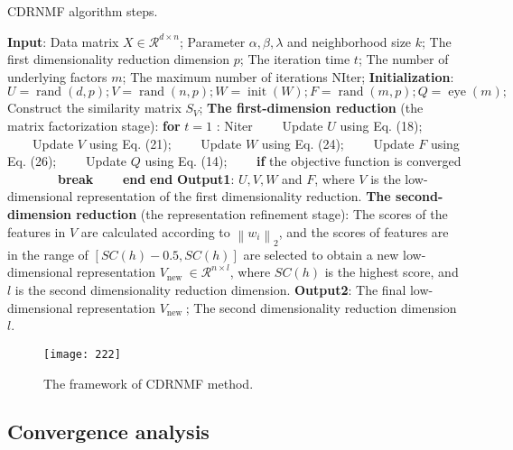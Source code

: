 \documentclass[a4paper,fleqn]{cas-sc}
\begin{document}
\begin{algorithm}[h]
	\caption{CDRNMF algorithm steps.}
	{\footnotesize
	\begin{algorithmic}[1]
		\State \textbf{Input}: Data matrix $X \in \mathcal{R}^{d \times n}$; Parameter $\alpha, \beta, \lambda$ and neighborhood size $k$; The first dimensionality reduction dimension $p$; The iteration time $t$; The number of underlying factors $m$; The maximum number of iterations NIter;
		\State \textbf{Initialization}: $U=\operatorname{rand}(d, p) ; V=\operatorname{rand}(n, p) ; W=\operatorname{init}(W) ; F=\operatorname{rand}(m, p) ; Q=\operatorname{eye}(m) ;$ Construct the similarity matrix $S_V$;
		\State \textbf{The first-dimension reduction} (the matrix factorization stage):
		\State \textbf{for} $t=1$ : Niter
		\State ~~~~Update $U$ using Eq. (18);
		\State ~~~~Update $V$ using Eq. (21);
		\State ~~~~Update $W$ using Eq. (24);
		\State ~~~~Update $F$ using Eq. (26);
		\State ~~~~Update $Q$ using Eq. (14);
		\State ~~~~\textbf{if} the objective function is converged
		\State ~~~~~~~~\textbf{break}
		\State ~~~~\textbf{end}
		\State \textbf{end}
		\State \textbf{Output1}: $U, V, W$ and $F$, where $V$ is the low-dimensional representation of the first dimensionality reduction.
		\State \textbf{The second-dimension reduction} (the representation refinement stage): The scores of the features in $V$ are calculated according to $\left\|w_i\right\|_2$, and the scores of features are in the range of $[S C(h)-0.5, S C(h)]$ are selected to obtain a new low-dimensional representation $V_{\text {new }} \in \mathcal{R}^{n \times l}$, where $S C(h)$ is the highest score, and $l$ is the second dimensionality reduction dimension.
		\State \textbf{Output2}: The final low-dimensional representation $V_{\text {new }}$; The second dimensionality reduction dimension $l$.
		
	\end{algorithmic}
}
\end{algorithm}








\begin{figure*}[h]
	\centering
	\texttt{[image: 222]}
	\caption{The framework of CDRNMF method.}
	\label{fig_2}
\end{figure*}




\subsection{Convergence analysis}
\end{document}
